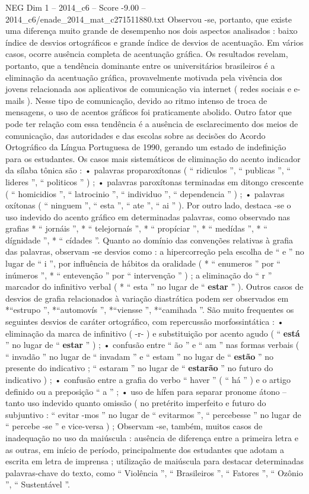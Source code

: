 \begin{textsample}{NEG Dim 1 – 2014\_c6 – Score -9.00 – 2014\_c6/enade\_2014\_mat\_c271511880.txt}
Observou -se, portanto, que existe uma diferença muito grande de desempenho nos dois aspectos analisados : baixo índice de desvios ortográficos e grande índice de desvios de acentuação.
Em vários casos, ocorre ausência completa de acentuação gráfica.
Os resultados revelam, portanto, que a tendência dominante entre os universitários brasileiros é a eliminação da acentuação gráfica, provavelmente motivada pela vivência dos jovens relacionada aos aplicativos de comunicação via internet ( redes sociais e e-mails ).
Nesse tipo de comunicação, devido ao ritmo intenso de troca de mensagens, o uso de acentos gráficos foi praticamente abolido.
Outro fator que pode ter relação com essa tendência é a ausência de esclarecimento dos meios de comunicação, das autoridades e das escolas sobre as decisões do Acordo Ortográfico da Língua Portuguesa de 1990, gerando um estado de indefinição para os estudantes.
Os casos mais sistemáticos de eliminação do acento indicador da sílaba tônica são : • palavras proparoxítonas ( “ ridiculos ”, “ publicas ”, “ lideres ”, “ politicos ” ) ; • palavras paroxítonas terminadas em ditongo crescente ( “ homicidios ”, “ latrocinio ”, “ individuo ”, “ dependencia ” ) ; • palavras oxítonas ( “ ninguem ”, “ esta ”, “ ate ”, “ ai ” ).
Por outro lado, destaca -se o uso indevido do acento gráfico em determinadas palavras, como observado nas grafias * “ jornáis ”, * “ telejornaís ”, * “ propíciar ”, * “ medídas ”, * “ dígnidade ”, * “ cídades ”.
Quanto ao domínio das convenções relativas à grafia das palavras, observam -se desvios como : a hipercorreção pela escolha de “ e ” no lugar de “ i ”, por influência de hábitos da oralidade ( * “ enumeros ” por “ inúmeros ”, * “ entevenção ” por “ intervenção ” ) ; a eliminação do “ r ” marcador do infinitivo verbal ( * “ esta ” no lugar de “ \textbf{estar} ” ).
Outros casos de desvios de grafia relacionados à variação diastrática podem ser observados em *“estrupo ”, *“automovís ”, *“viensse ”, *“camihada ”.
São muito frequentes os seguintes desvios de caráter ortográfico, com repercussão morfossintática : • eliminação da marca de infinitivo ( -r- ) e substituição por acento agudo ( “ \textbf{está} ” no lugar de “ \textbf{estar} ” ) ; • confusão entre “ ão ” e “ am ” nas formas verbais ( “ invadão ” no lugar de “ invadam ” e “ estam ” no lugar de “ \textbf{estão} ” no presente do indicativo ; “ estaram ” no lugar de “ \textbf{estarão} ” no futuro do indicativo ) ; • confusão entre a grafia do verbo “ haver ” ( “ há ” ) e o artigo definido ou a preposição “ a ” ; • uso de hífen para separar pronome átono – tanto uso indevido quanto omissão ( no pretérito imperfeito e futuro do subjuntivo : “ evitar -mos ” no lugar de “ evitarmos ”, “ percebesse ” no lugar de “ percebe -se ” e vice-versa ) ; Observam -se, também, muitos casos de inadequação no uso da maiúscula : ausência de diferença entre a primeira letra e as outras, em início de período, principalmente dos estudantes que adotam a escrita em letra de imprensa ; utilização de maiúscula para destacar determinadas palavras-chave do texto, como “ Violência ”, “ Brasileiros ”, “ Fatores ”, “ Ozônio ”, “ Sustentável ”.

\end{textsample}
